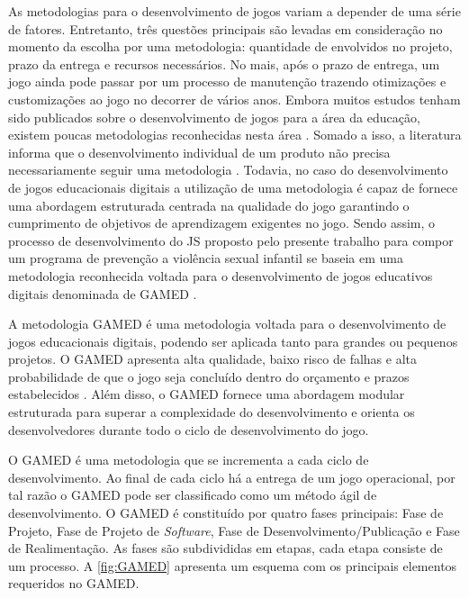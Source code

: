 As metodologias para o desenvolvimento de jogos variam a depender de uma série de fatores. Entretanto, três questões principais são levadas em consideração no momento da escolha por uma metodologia: quantidade de envolvidos no projeto, prazo da entrega e recursos necessários. No mais, após o prazo de entrega, um jogo ainda pode passar por um processo de manutenção trazendo otimizações e customizações ao jogo no decorrer de vários anos. Embora muitos estudos tenham sido publicados sobre o desenvolvimento de jogos para a área da educação, existem poucas metodologias reconhecidas nesta área \cite{aslan2015gamed}. Somado a isso, a literatura informa que o desenvolvimento individual de um produto não precisa necessariamente seguir uma metodologia \cite{valente2021engenharia}. Todavia, no caso do desenvolvimento de jogos educacionais digitais a utilização de uma metodologia é capaz de fornece uma abordagem estruturada centrada na qualidade do jogo garantindo o cumprimento de objetivos de aprendizagem exigentes no jogo. Sendo assim, o processo de desenvolvimento do \ac{JS} proposto pelo presente trabalho para compor um programa de prevenção a violência sexual infantil se baseia em uma metodologia reconhecida voltada para o desenvolvimento de jogos educativos digitais denominada de \ac{GAMED} \cite{aslan2016digital}. 

A metodologia \ac{GAMED} é uma metodologia voltada para o desenvolvimento de jogos educacionais digitais, podendo ser aplicada tanto para grandes ou pequenos projetos. O \ac{GAMED} apresenta alta qualidade, baixo risco de falhas e alta probabilidade de que o jogo seja concluído dentro do orçamento e prazos estabelecidos \cite{aslan2015gamed}. Além disso, o \ac{GAMED} fornece uma abordagem modular estruturada para superar a complexidade do desenvolvimento e orienta os desenvolvedores durante todo o ciclo de desenvolvimento do jogo.

O \ac{GAMED} é uma metodologia que se incrementa a cada ciclo de desenvolvimento. Ao final de cada ciclo há a entrega de um jogo operacional, por tal razão o \ac{GAMED} pode ser classificado como um método ágil de desenvolvimento. O \ac{GAMED} é constituído por quatro fases principais: Fase de Projeto, Fase de Projeto de \textit{Software}, Fase de Desenvolvimento/Publicação e Fase de Realimentação. As fases são subdivididas em etapas, cada etapa consiste de um processo. A \autoref{fig:GAMED} apresenta um esquema com os principais elementos requeridos no \ac{GAMED}. 

\pagebreak

